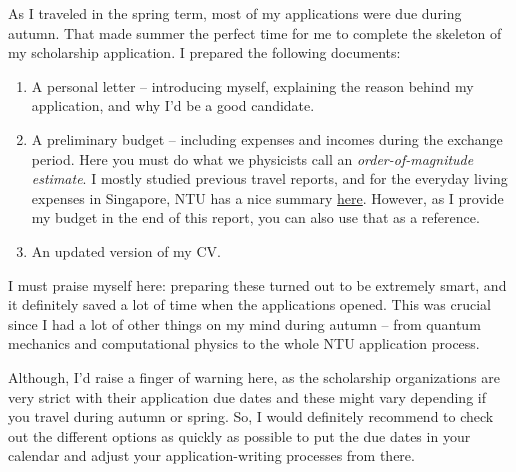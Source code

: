 As I traveled in the spring term, most of my applications were due during autumn. That made summer the perfect time for me to complete the skeleton of my scholarship application. I prepared the following documents:
\begin{enumerate}
    \item A personal letter -- introducing myself, explaining the reason behind my application, and why I'd be a good candidate.
    \item A preliminary budget -- including expenses and incomes during the exchange period. Here you must do what we physicists call an \textit{order-of-magnitude estimate}. I mostly studied previous travel reports, and for the everyday living expenses in Singapore, NTU has a nice summary \href{https://www.ntu.edu.sg/eee/admissions/programmes/graduate-programmes/international-students}{here}. However, as I provide my budget in the end of this report, you can also use that as a reference.
    \item An updated version of my CV.
\end{enumerate}
\vspace{-0.3cm}
I must praise myself here: preparing these turned out to be extremely smart, and it definitely saved a lot of time when the applications opened. This was crucial since I had a lot of other things on my mind during autumn -- from quantum mechanics and computational physics to the whole NTU application process.

Although, I'd raise a finger of warning here, as the scholarship organizations are very strict with their application due dates and these might vary depending if you travel during autumn or spring. So, I would definitely recommend to check out the different options as quickly as possible to put the due dates in your calendar and adjust your application-writing processes from there.

\hrulefill

